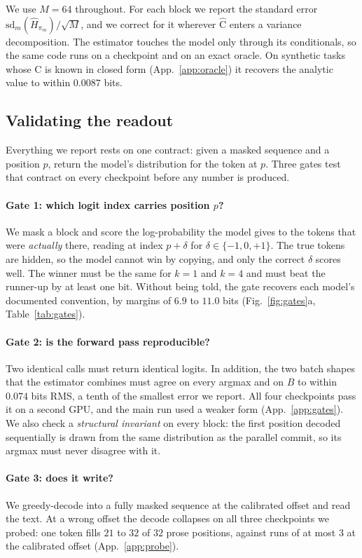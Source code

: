 \documentclass{article}
\newcommand{\C}{\mathrm{C}}
\newcommand{\Chat}{\widehat{\C}}
\begin{document}
We use $M{=}64$ throughout. For each block we report the standard error
$\mathrm{sd}_m(\hat H_{\pi_m})/\sqrt{M}$, and we correct for it wherever $\Chat$ enters a
variance decomposition. The estimator touches the model only through its conditionals, so the same code
runs on a checkpoint and on an exact oracle. On synthetic tasks whose $\C$ is known in
closed form (App.~\ref{app:oracle}) it recovers the analytic value to within $0.0087$
bits.

\subsection{Validating the readout}
\label{sec:bugimpact}

Everything we report rests on one contract: given a masked sequence and a position $p$,
return the model's distribution for the token at $p$. Three gates test that contract on
every checkpoint before any number is produced.

\paragraph{Gate 1: which logit index carries position $p$?} We mask
a block and score the log-probability the model gives to the tokens that were
\emph{actually} there, reading at index $p+\delta$ for $\delta\in\{-1,0,+1\}$. The true
tokens are hidden, so the model cannot win by copying, and only the correct $\delta$
scores well. The winner must be the same for $k{=}1$ and $k{=}4$ and must beat the
runner-up by at least one bit. Without being told, the gate recovers each model's
documented convention, by margins of $6.9$ to $11.0$ bits (Fig.~\ref{fig:gates}a,
Table~\ref{tab:gates}).

\paragraph{Gate 2: is the forward pass reproducible?} Two identical calls must return
identical logits. In addition, the two batch shapes that the estimator combines must
agree on every argmax and on $B$ to within $0.074$ bits RMS, a tenth of the smallest
error we report. All four checkpoints pass it on a second GPU, and the main run used a weaker form
(App.~\ref{app:gates}). We also check a \emph{structural invariant} on every block: the
first position decoded sequentially is drawn from the same distribution as the parallel
commit, so its argmax must never disagree with it.

\paragraph{Gate 3: does it write?} We greedy-decode into a fully masked sequence at the
calibrated offset and read the text. At a wrong offset the decode collapses on all three
checkpoints we probed: one token fills $21$ to $32$ of $32$ prose positions, against
runs of at most $3$ at the calibrated offset (App.~\ref{app:probe}).
\end{document}
